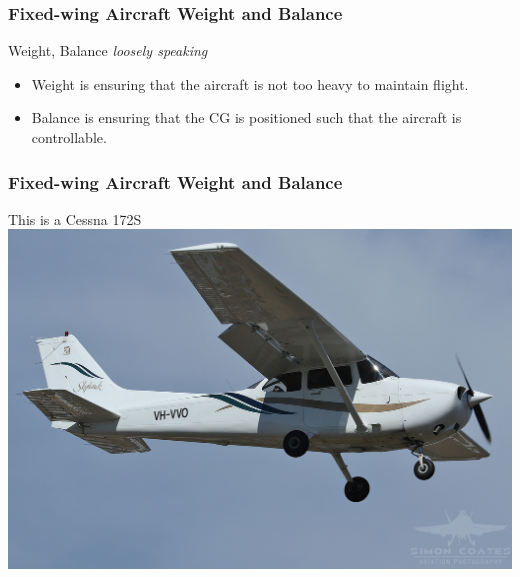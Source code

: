 \begin{frame}
\frametitle{Fixed-wing Aircraft Weight and Balance}
\begin{block}{Weight, Balance \emph{\tiny{loosely speaking}}}
\begin{itemize}
\item Weight is ensuring that the aircraft is not too heavy to maintain flight.
\item Balance is ensuring that the CG is positioned such that the aircraft is controllable.
\end{itemize}
\end{block}
\end{frame}

\begin{frame}
\frametitle{Fixed-wing Aircraft Weight and Balance}
\begin{block}{This is a Cessna 172S}
\includegraphics[height=0.5\textheight]{image/vhvvo.jpg}
\end{block}
\end{frame}

